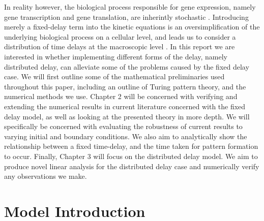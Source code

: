 In reality however, the biological process responsible for gene expression, namely gene transcription and gene translation, are inherintly stochastic \cite{raj,elowitz,mcadams,paulsson}. Introducing merely a fixed-delay term into the kinetic equations is an oversimplification of the underlying biological process on a cellular level, and leads us to consider a distribution of time delays at the macroscopic level \cite{bratsun,krausenew}. In this report we are interested in whether implementing different forms of the delay, namely distributed delay, can alleviate some of the problems caused by the fixed delay case. We will first outline some of the mathematical preliminaries used throughout this paper, including an outline of Turing pattern theory, and the numerical methods we use. Chapter 2 will be concerned with verifying and extending the numerical results in current literature concerned with the fixed delay model, as well as looking at the presented theory in more depth. We will specifically be concerned with evaluating the robustness of current results to varying initial and boundary conditions. We also aim to analytically show the relationship between a fixed time-delay, and the time taken for pattern formation to occur. Finally, Chapter 3 will focus on the distributed delay model. We aim to produce novel linear analysis for the distributed delay case and numerically verify any observations we make.

\section{Model Introduction}

